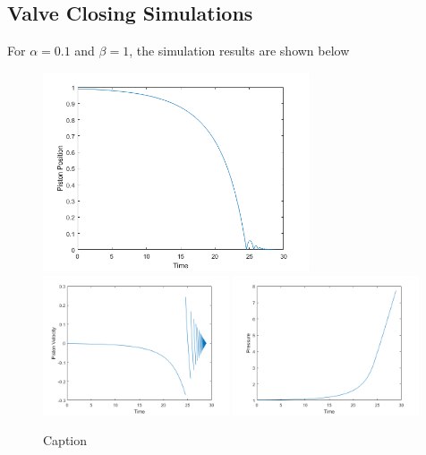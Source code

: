 \subsection{Valve Closing Simulations}



For $\alpha = 0.1$ and $\beta = 1$, the simulation results are shown below

\begin{figure}[!ht]
    \centering
    \includegraphics[width=0.7\textwidth]{Figures/Example/PositionTimeTrajectory.png}
    \includegraphics[width=0.49\textwidth]{Figures/Example/VelocityTimeTrajectory.png}
    \includegraphics[width=0.49\textwidth]{Figures/Example/PressureTimeTrajectory.png}
    \caption{Caption}
    \label{fig:TimeTrajec}
\end{figure}


